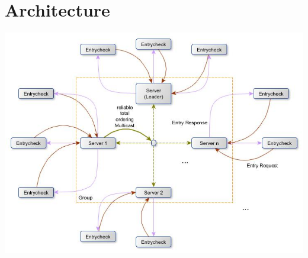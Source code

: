 \documentclass[runningheads]{llncs}
\begin{document}
\section{Architecture}
\includegraphics[width=\textwidth]{architecture_graph.jpg}
\end{document}
